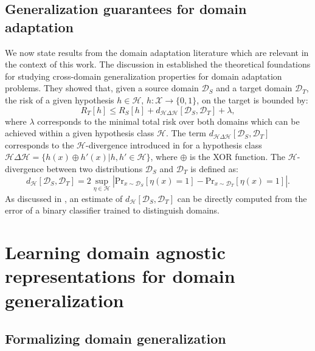 \documentclass{article}
\begin{document}
\subsection{Generalization guarantees for domain adaptation} 
We now state results from the domain adaptation literature which are relevant in the context of this work. 
The discussion in \cite{ben2010theory} established the theoretical foundations for studying cross-domain generalization properties for domain adaptation problems. They showed that, given a source domain $\mathcal{D}_S$ and a target domain $\mathcal{D}_T$, the risk of a given hypothesis $h \in \mathcal{H}$, $h:\mathcal{X}\rightarrow\{0,1\}$, on the target is bounded by:
\begin{equation}\label{eq:bound_da}
    R_T[h] \leq R_S[h] + d_{\mathcal{H}\Delta\mathcal{H}}[\mathcal{D}_S, \mathcal{D}_T] + \lambda,
\end{equation}
where $\lambda$ corresponds to the minimal total risk over both domains which can be achieved within a given hypothesis class $\mathcal{H}$. The term $d_{\mathcal{H}\Delta\mathcal{H}}[\mathcal{D}_S, \mathcal{D}_T]$ corresponds to the $\mathcal{H}$-divergence introduced in \cite{kifer2004detecting} for a hypothesis class $\mathcal{H}\Delta\mathcal{H}=\{h(x) \oplus h'(x) | h, h' \in \mathcal{H}\}$, where $\oplus$ is the XOR function. The $\mathcal{H}$-divergence between two distributions $\mathcal{D}_S$  and $\mathcal{D}_T$ is defined as: 
\begin{equation}
        d_{\mathcal{H}}[\mathcal{D}_S, \mathcal{D}_T] = 2 \sup_{\eta \in \mathcal{H}} | \text{Pr}_{x\sim\mathcal{D}_S} [\eta(x)=1]
        - \text{Pr}_{x\sim\mathcal{D}_T} [\eta(x)=1] |.        
\end{equation}
As discussed in \cite{ben2007analysis}, an estimate of $d_{\mathcal{H}}[\mathcal{D}_S, \mathcal{D}_T]$ can be directly computed from the error of a binary classifier trained to distinguish domains.

\section{Learning domain agnostic representations for domain generalization}\label{sec:method}

\subsection{Formalizing domain generalization}
\end{document}
